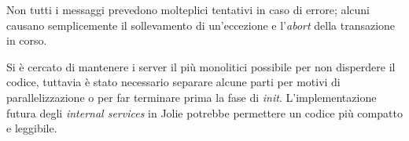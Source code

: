 \documentclass[a4paper]{article}
\begin{document}
Non tutti i messaggi prevedono molteplici tentativi in caso di errore; alcuni causano semplicemente il sollevamento di un'eccezione e l'\textit{abort} della transazione in corso.

Si è cercato di mantenere i server il più monolitici possibile per non disperdere il codice, tuttavia è stato necessario separare alcune parti per motivi di parallelizzazione o per far terminare prima la fase di \textit{init}. L'implementazione futura degli \textit{internal services} in Jolie potrebbe permettere un codice più compatto e leggibile.


\appendix
\end{document}
